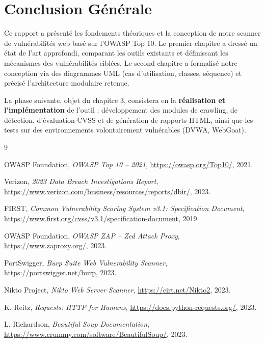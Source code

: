 \documentclass[12pt, a4paper]{report}
\begin{document}
\chapter*{Conclusion Générale}

\onehalfspacing

Ce rapport a présenté les fondements théoriques et la conception de notre scanner
de vulnérabilités web basé sur l'OWASP Top 10. Le premier chapitre a dressé un
état de l'art approfondi, comparant les outils existants et définissant les
mécanismes des vulnérabilités ciblées. Le second chapitre a formalisé notre
conception via des diagrammes UML (cas d'utilisation, classes, séquence) et
précisé l'architecture modulaire retenue.

La phase suivante, objet du chapitre 3, consistera en la \textbf{réalisation et
l'implémentation} de l'outil : développement des modules de crawling, de détection,
d'évaluation CVSS et de génération de rapports HTML, ainsi que les tests sur des
environnements volontairement vulnérables (DVWA, WebGoat).

\begin{thebibliography}{9}

OWASP Foundation,
\textit{OWASP Top 10 -- 2021},
\url{https://owasp.org/Top10/}, 2021.

Verizon,
\textit{2023 Data Breach Investigations Report},
\url{https://www.verizon.com/business/resources/reports/dbir/}, 2023.

FIRST,
\textit{Common Vulnerability Scoring System v3.1: Specification Document},
\url{https://www.first.org/cvss/v3.1/specification-document}, 2019.

OWASP Foundation,
\textit{OWASP ZAP -- Zed Attack Proxy},
\url{https://www.zaproxy.org/}, 2023.

PortSwigger,
\textit{Burp Suite Web Vulnerability Scanner},
\url{https://portswigger.net/burp}, 2023.

Nikto Project,
\textit{Nikto Web Server Scanner},
\url{https://cirt.net/Nikto2}, 2023.

K. Reitz,
\textit{Requests: HTTP for Humans},
\url{https://docs.python-requests.org/}, 2023.

L. Richardson,
\textit{Beautiful Soup Documentation},
\url{https://www.crummy.com/software/BeautifulSoup/}, 2023.

\end{thebibliography}
\end{document}
